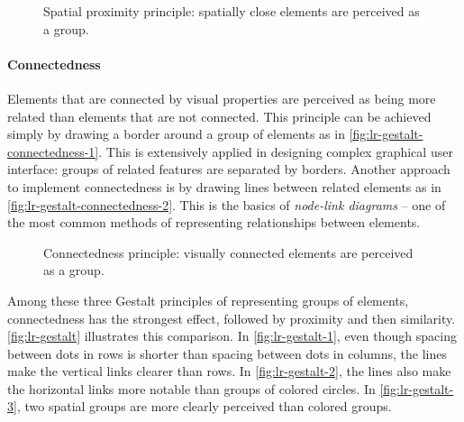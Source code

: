 \begin{figure}[!htb]
\centering
{} 
\hfill
{} 
\hfill
{}
\label{fig:lr-gestalt-proximity}
\caption{Spatial proximity principle: spatially close elements are perceived as a group. }
\end{figure}

\paragraph{Connectedness} 
Elements that are connected by visual properties are perceived as being more related than elements that are not connected. This principle can be achieved simply by drawing a border around a group of elements as in \autoref{fig:lr-gestalt-connectedness-1}. This is extensively applied in designing complex graphical user interface: groups of related features are separated by borders. Another approach to implement connectedness is by drawing lines between related elements as in \autoref{fig:lr-gestalt-connectedness-2}. This is the basics of \emph{node-link diagrams} -- one of the most common methods of representing relationships between elements.

\begin{figure}[!htb]
\centering
{} 
\hfill
{} 
\caption{Connectedness principle: visually connected elements are perceived as a group. }
\label{fig:lr-gestalt-connectedness}
\end{figure}

Among these three Gestalt principles of representing groups of elements, connectedness has the strongest effect, followed by proximity and then similarity. \autoref{fig:lr-gestalt} illustrates this comparison. In \autoref{fig:lr-gestalt-1}, even though spacing between dots in rows is shorter than spacing between dots in columns, the lines make the vertical links clearer than rows. In \autoref{fig:lr-gestalt-2}, the lines also make the horizontal links more notable than groups of colored circles. In \autoref{fig:lr-gestalt-3}, two spatial groups are more clearly perceived than colored groups.

